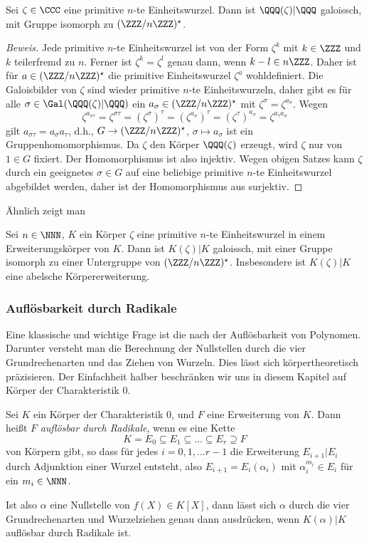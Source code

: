 \documentclass[12pt,a4paper,twoside]{article}
\newcommand{\ei}[1]{\emph{#1}\index{#1}}
\begin{document}
\begin{Korollar}\label{K:zetaphi}
  Sei $\zeta\in\CCC$ eine primitive $n$-te Einheitswurzel. Dann ist
  $\QQQ(\zeta)|\QQQ$ galoissch, mit Gruppe isomorph zu $(\ZZZ/n\ZZZ)^\star$.
\end{Korollar}
\begin{proof}[Beweis]
  Jede primitive $n$-te Einheitswurzel ist von der Form $\zeta^k$ mit
  $k\in\ZZZ$ und $k$ teilerfremd zu $n$. Ferner ist $\zeta^k=\zeta^l$ genau
  dann, wenn $k-l\in n\ZZZ$. Daher ist f\"ur $a\in(\ZZZ/n\ZZZ)^\star$ die
  primitive Einheitswurzel $\zeta^a$ wohldefiniert. Die Galoisbilder von
  $\zeta$ sind wieder primitive $n$-te Einheitswurzeln, daher gibt es f\"ur
  alle $\sigma\in\Gal(\QQQ(\zeta)|\QQQ)$ ein $a_\sigma\in(\ZZZ/n\ZZZ)^\star$
  mit $\zeta^\sigma=\zeta^{a_\sigma}$. Wegen
\[
\zeta^{a_{\sigma\tau}}= \zeta^{\sigma\tau}=(\zeta^\sigma)^\tau=
(\zeta^{a_\sigma})^\tau= (\zeta^\tau)^{a_\sigma}=\zeta^{a_\tau a_\sigma}
\]
gilt $a_{\sigma\tau}=a_\sigma a_\tau$, d.h., $G\to (\ZZZ/n\ZZZ)^\star$,
$\sigma\mapsto a_\sigma$ ist ein Gruppenhomomorphismus. Da $\zeta$ den
K\"orper $\QQQ(\zeta)$ erzeugt, wird $\zeta$ nur von $1\in G$ fixiert. Der
Homomorphismus ist also injektiv. Wegen obigen Satzes kann $\zeta$ durch ein
geeignetes $\sigma\in G$ auf eine beliebige primitive $n$-te Einheitswurzel
abgebildet werden, daher ist der Homomorphismus aus surjektiv.
\end{proof}
\"Ahnlich zeigt man
\begin{Lemma}\label{L:Kz:K}
  Sei $n\in\NNN$, $K$ ein K\"orper $\zeta$ eine primitive $n$-te
  Einheitswurzel in einem Erweiterungsk\"orper von $K$. Dann ist $K(\zeta)|K$
  galoissch, mit einer Gruppe isomorph zu einer Untergruppe von
  $(\ZZZ/n\ZZZ)^\star$. Insbesondere ist $K(\zeta)|K$ eine abelsche
  K\"orpererweiterung.
\end{Lemma}
\subsubsection{Aufl\"osbarkeit durch Radikale}
Eine klassische und wichtige Frage ist die nach der Aufl\"osbarkeit von
Polynomen. Darunter versteht man die Berechnung der Nullstellen durch die vier
Grundrechenarten und das Ziehen von Wurzeln. Dies l\"asst sich
k\"orpertheoretisch pr\"azisieren. Der Einfachheit halber beschr\"anken wir
uns in diesem Kapitel auf K\"orper der Charakteristik $0$.
\begin{Definition*}
  Sei $K$ ein K\"orper der Charakteristik $0$, und $F$ eine Erweiterung von
  $K$. Dann hei\ss t $F$ \ei{aufl\"osbar durch Radikale}, wenn es eine Kette
\[
K=E_0\subseteq E_1\subseteq\dots\subseteq E_r\supseteq F
\]
von K\"orpern gibt, so dass f\"ur jedes $i=0,1,\dots r-1$ die Erweiterung
$E_{i+1}|E_i$ durch Adjunktion einer Wurzel entsteht, also
$E_{i+1}=E_i(\alpha_i)$ mit $\alpha_i^{m_i}\in E_i$ f\"ur ein $m_i\in\NNN$.
\end{Definition*}
Ist also $\alpha$ eine Nullstelle von $f(X)\in K[X]$, dann l\"asst sich
$\alpha$ durch die vier Grundrechenarten und Wurzelziehen genau dann
ausdr\"ucken, wenn $K(\alpha)|K$ aufl\"osbar durch Radikale ist.
\end{document}
